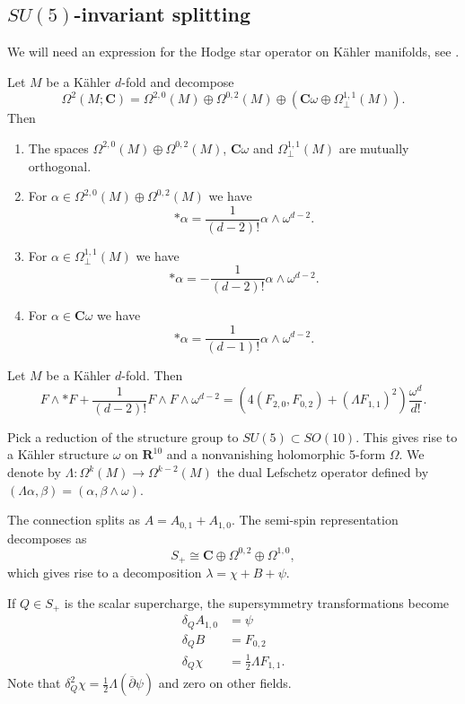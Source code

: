 \documentclass[10pt, oneside]{article}
\newcommand{\C}{\mathbf{C}}
\newcommand{\R}{\mathbf{R}}
\begin{document}
\subsection{$SU(5)$-invariant splitting}

We will need an expression for the Hodge star operator on K\"{a}hler manifolds, see \cite[Proposition 1.2.31]{Huybrechts}.

\begin{prop}
Let $M$ be a K\"{a}hler $d$-fold and decompose
\[\Omega^2(M; \C) = \Omega^{2, 0}(M)\oplus \Omega^{0, 2}(M)\oplus (\C\omega\oplus \Omega^{1, 1}_\perp(M)).\]
Then
\begin{enumerate}
\item The spaces $\Omega^{2, 0}(M)\oplus \Omega^{0, 2}(M)$, $\C\omega$ and $\Omega^{1, 1}_\perp(M)$ are mutually orthogonal.

\item For $\alpha\in\Omega^{2, 0}(M)\oplus \Omega^{0, 2}(M)$ we have
\[\ast \alpha = \frac{1}{(d-2)!} \alpha\wedge \omega^{d-2}.\]

\item For $\alpha\in \Omega^{1, 1}_\perp(M)$ we have
\[\ast\alpha = -\frac{1}{(d-2)!} \alpha\wedge \omega^{d-2}.\]

\item For $\alpha\in\C\omega$ we have
\[\ast \alpha = \frac{1}{(d-1)!} \alpha\wedge \omega^{d-2}.\]
\end{enumerate}
\end{prop}

\begin{corollary}
Let $M$ be a K\"{a}hler $d$-fold. Then
\[F\wedge \ast F + \frac{1}{(d-2)!} F\wedge F\wedge \omega^{d-2} = \left(4(F_{2, 0}, F_{0, 2}) + (\Lambda F_{1, 1})^2\right) \frac{\omega^d}{d!}.\]
\end{corollary}

Pick a reduction of the structure group to $SU(5)\subset SO(10)$. This gives rise to a K\"{a}hler structure $\omega$ on $\R^{10}$ and a nonvanishing holomorphic 5-form $\Omega$. We denote by $\Lambda\colon \Omega^k(M)\rightarrow \Omega^{k-2}(M)$ the dual Lefschetz operator defined by $(\Lambda \alpha, \beta) = (\alpha, \beta\wedge \omega)$.

The connection splits as $A = A_{0, 1} + A_{1, 0}$. The semi-spin representation decomposes as
\[S_+ \cong \C\oplus \Omega^{0, 2} \oplus \Omega^{1, 0},\]
which gives rise to a decomposition $\lambda = \chi + B + \psi$.

If $Q\in S_+$ is the scalar supercharge, the supersymmetry transformations become
\begin{align*}
\delta_Q A_{1, 0} &= \psi \\
\delta_Q B &= F_{0, 2} \\
\delta_Q \chi &= \frac{1}{2} \Lambda F_{1, 1}.
\end{align*}
Note that $\delta_Q^2 \chi = \frac{1}{2} \Lambda(\overline{\partial} \psi)$ and zero on other fields.
\end{document}
